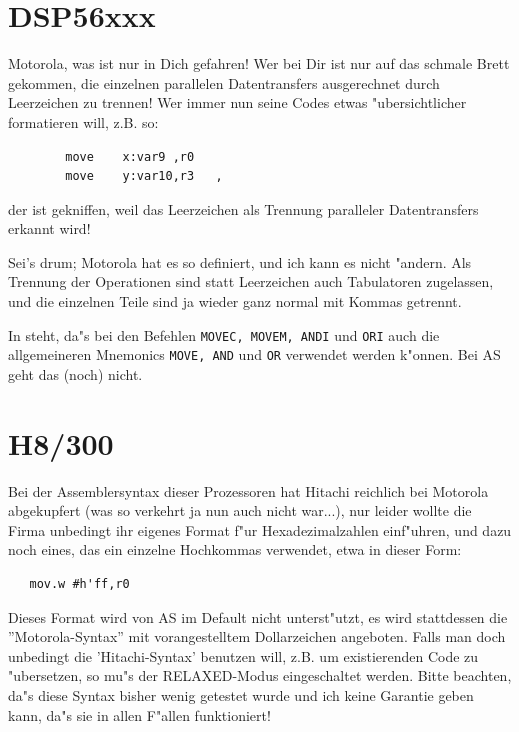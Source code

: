 \documentclass[12pt,a4paper,twoside]{report}
\newcommand{\tty}[1]{{\tt #1}}
\newcommand{\asname}{AS}
\begin{document}

\section{DSP56xxx}

Motorola, was ist nur in Dich gefahren!  Wer bei Dir ist nur auf das
schmale Brett gekommen, die einzelnen parallelen Datentransfers
ausgerechnet durch Leerzeichen zu trennen!  Wer immer nun seine Codes
etwas "ubersichtlicher formatieren will, z.B. so:
\begin{verbatim}
        move    x:var9 ,r0
        move    y:var10,r3   ,
\end{verbatim}
der ist gekniffen, weil das Leerzeichen als Trennung paralleler
Datentransfers erkannt wird!
\par
Sei's drum; Motorola hat es so definiert, und ich kann es nicht
"andern.  Als Trennung der Operationen sind statt Leerzeichen auch
Tabulatoren zugelassen, und die einzelnen Teile sind ja wieder ganz
normal mit Kommas getrennt.
\par
In \cite{Mot56} steht, da"s bei den Befehlen \tty{MOVEC, MOVEM, ANDI} und
\tty{ORI} auch die allgemeineren Mnemonics \tty{MOVE, AND} und \tty{OR}
verwendet werden k"onnen.  Bei \asname{} geht das (noch) nicht.


\section{H8/300}

Bei der Assemblersyntax dieser Prozessoren hat Hitachi reichlich
bei Motorola abgekupfert (was so verkehrt ja nun auch nicht war...),
nur leider wollte die Firma unbedingt ihr eigenes Format f"ur
Hexadezimalzahlen einf"uhren, und dazu noch eines, das ein einzelne
Hochkommas verwendet, etwa in dieser Form:
\begin{verbatim}
   mov.w #h'ff,r0
\end{verbatim}
Dieses Format wird von \asname{} im Default nicht unterst"utzt, es wird
stattdessen die ''Motorola-Syntax'' mit vorangestelltem Dollarzeichen
angeboten.  Falls man doch unbedingt die 'Hitachi-Syntax' benutzen
will, z.B. um existierenden Code zu "ubersetzen, so mu"s der
RELAXED-Modus eingeschaltet werden.  Bitte beachten, da"s diese Syntax
bisher wenig getestet wurde und ich keine Garantie geben kann, da"s sie
in allen F"allen funktioniert!
\end{document}
